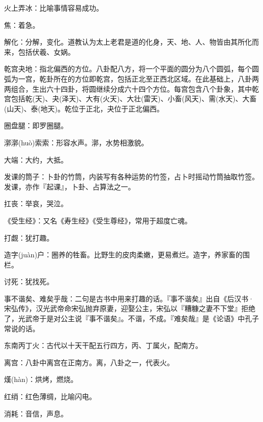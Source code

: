 \startbuffer[1246]
火上弄冰：比喻事情容易成功。
\stopbuffer


\startbuffer[1247]
焦：着急。
\stopbuffer


\startbuffer[1248]
解化：分解，变化。道教认为太上老君是道的化身，天、地、人、物皆由其所化而来，包括伏羲、女娲。
\stopbuffer


\startbuffer[1249]
乾宫夬地：指北偏西的方位。八卦配八方，将一个平面的圆分为八个圆弧，每个圆弧为一宫，乾卦所在的方位即乾宫，包括正北至正西北区域。在此基础上，八卦两两组合，生出六十四卦，将圆继续分成六十四个方位。每宫包含八个卦象，其中乾宫包括乾(天)、夬(泽天)、大有(火天)、大壮(雷天)、小畜(风天)、需(水天)、大畜(山天)、泰(地天)。乾位于正北，夬位于正北偏西。
\stopbuffer


\startbuffer[1250]
圈盘腿：即罗圈腿。
\stopbuffer


\startbuffer[1251]
漷漷(huò)索索：形容水声。漷，水势相激貌。
\stopbuffer


\startbuffer[1252]
大端：大约，大抵。
\stopbuffer


\startbuffer[1253]
发课的筒子：卜卦的竹筒，内装写有各种运势的竹签，占卜时摇动竹筒抽取竹签。发课，亦作『起课』，卜卦、占算法之一。
\stopbuffer


\startbuffer[1254]
扛丧：举哀，哭泣。
\stopbuffer


\startbuffer[1255]
《受生经》：又名《寿生经》《受生尊经》，常用于超度亡魂。
\stopbuffer


\startbuffer[1256]
打觑：犹打趣。
\stopbuffer


\startbuffer[1257]
造字(juàn)户：圈养的牲畜。比野生的皮肉柔嫩，更易煮烂。造字，养家畜的围栏。
\stopbuffer


\startbuffer[1258]
讨死：犹找死。
\stopbuffer


\startbuffer[1259]
事不谐矣、难矣乎哉：二句是古书中用来打趣的话。『事不谐矣』出自《后汉书·宋弘传》，汉光武帝命宋弘抛弃原妻，迎娶公主，宋弘以『糟糠之妻不下堂』拒绝了，光武帝于是对公主说『事不谐矣』。不谐，不成。『难矣哉』是《论语》中孔子常说的话。
\stopbuffer


\startbuffer[1260]
东南丙丁火：古代以十天干配五行四方，丙、丁属火，配南方。
\stopbuffer


\startbuffer[1261]
离宫：八卦中离宫在正南方。离，八卦之一，代表火。
\stopbuffer


\startbuffer[1262]
熯(hàn)：烘烤，燃烧。
\stopbuffer


\startbuffer[1263]
红绡：红色薄绸，比喻闪电。
\stopbuffer


\startbuffer[1264]
消耗：音信，声息。
\stopbuffer


